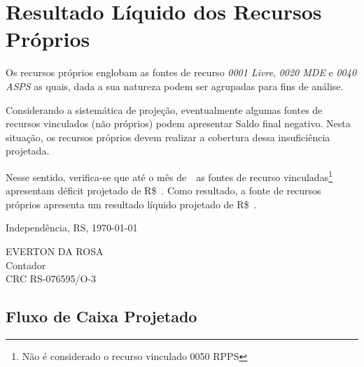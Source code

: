 \documentclass[12pt, a4paper]{report}
\begin{document}
\chapter*{Resultado Líquido dos Recursos Próprios} \label{ch:resultado_recursos_proprios}

Os recursos próprios englobam as fontes de recurso \textit{0001 Livre}, \textit{0020 MDE} e \textit{0040 ASPS} as quais, dada a sua natureza podem ser agrupadas para fins de análise.

Considerando a sistemática de projeção, eventualmente algumas fontes de recursos vinculados (não próprios) podem apresentar Saldo final negativo. Nesta situação, os recursos próprios devem realizar a cobertura dessa insuficiência projetada.

Nesse sentido, verifica-se que até o mês de~\thedate~as fontes de recurso vinculadas\footnote{Não é considerado o recurso vinculado 0050 RPPS} apresentam déficit projetado de R\$~. Como resultado, a fonte de recursos próprios apresenta um resultado líquido projetado de R\$~\resultadoProprio.



\vspace{16pt}

\begin{center}
	Independência, RS, \today
\end{center}

\vspace{36pt}

\begin{center}
	EVERTON DA ROSA\\
	Contador\\
	CRC RS-076595/O-3
\end{center}


\appendix

\begin{landscape}
\chapter*{Fluxo de Caixa Projetado} \label{app:fluxo_de_caixa}


\end{landscape}


\end{document}
